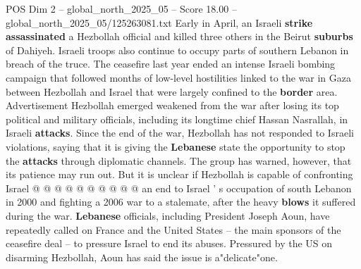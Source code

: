 \begin{textsample}{POS Dim 2 – global\_north\_2025\_05 – Score 18.00 – global\_north\_2025\_05/125263081.txt}
Early in April, an Israeli \textbf{strike} \textbf{assassinated} a Hezbollah official and killed three others in the Beirut \textbf{suburbs} of Dahiyeh.
Israeli troops also continue to occupy parts of southern Lebanon in breach of the truce.
The ceasefire last year ended an intense Israeli bombing campaign that followed months of low-level hostilities linked to the war in Gaza between Hezbollah and Israel that were largely confined to the \textbf{border} area.
Advertisement Hezbollah emerged weakened from the war after losing its top political and military officials, including its longtime chief Hassan Nasrallah, in Israeli \textbf{attacks}.
Since the end of the war, Hezbollah has not responded to Israeli violations, saying that it is giving the \textbf{Lebanese} state the opportunity to stop the \textbf{attacks} through diplomatic channels.
The group has warned, however, that its patience may run out.
But it is unclear if Hezbollah is capable of confronting Israel @ @ @ @ @ @ @ @ @ @ an end to Israel ' s occupation of south Lebanon in 2000 and fighting a 2006 war to a stalemate, after the heavy \textbf{blows} it suffered during the war. \textbf{Lebanese} officials, including President Joseph Aoun, have repeatedly called on France and the United States -- the main sponsors of the ceasefire deal -- to pressure Israel to end its abuses.
Pressured by the US on disarming Hezbollah, Aoun has said the issue is a"delicate"one.

\end{textsample}
